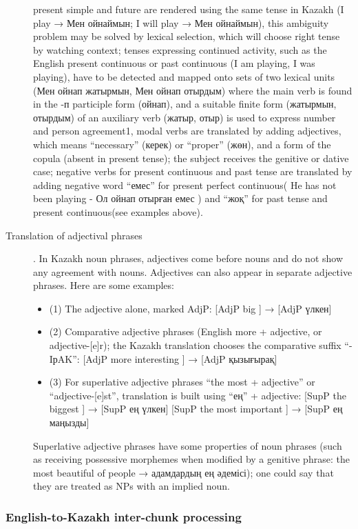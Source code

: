 \documentclass[11pt]{article}
\begin{document}
\begin{description}
present simple and future are rendered using the same tense in Kazakh (I play → Мен ойнаймын;  I will play → Мен ойнаймын), this ambiguity problem may be solved by lexical selection, which will choose right tense by watching context; 
tenses expressing continued activity, such as the English present continuous or past continuous (I am playing, I was playing), have to be detected and mapped onto sets of two lexical units (Мен ойнап жатырмын, Мен ойнап отырдым) where the main verb is found in the -п participle form (ойнап), and a suitable finite form  (жатырмын, отырдым) of an auxiliary verb (жатыр, отыр) is used to express number and person agreement1, 
modal verbs are translated by adding adjectives, which means ``necessary'' (керек) or ``proper'' (жөн), and a form of the copula (absent in present tense); the subject receives the genitive or dative case;
negative verbs for present continuous and past tense are translated by adding negative word ``емес'' for present perfect continuous( He has not been playing - Ол ойнап отырған емес ) and  ``жоқ'' for past tense and present continuous(see examples above).
\item[Translation of adjectival phrases]. In Kazakh noun phrases, adjectives come before nouns and do not show any agreement with nouns.  Adjectives can also appear in separate adjective phrases. Here are some examples:
\begin{itemize}
\item (1)  The adjective alone, marked AdjP: [AdjP big ] → [AdjP үлкен] 
\item (2)  Comparative adjective phrases  (English more + adjective, or adjective-[e]r); the Kazakh translation chooses the comparative suffix ``-{I}р{A}{K}'': [AdjP  more  interesting ]  → [AdjP қызығырақ]
\item (3)  For superlative adjective phrases  ``the most + adjective''  or ``adjective-[e]st'', translation is built using ``ең'' + adjective:  [SupP  the biggest ]  → [SupP ең үлкен] [SupP  the most important ]   → [SupP ең маңызды]
\end{itemize}
Superlative adjective phrases have some properties of noun phrases (such as receiving possessive morphemes when modified by a genitive phrase: the most beautiful of people → адамдардың ең әдемісі); one could say that they are treated as NPs with an implied noun.
\end{description}

\subsubsection{English-to-Kazakh inter-chunk processing}
\end{document}

